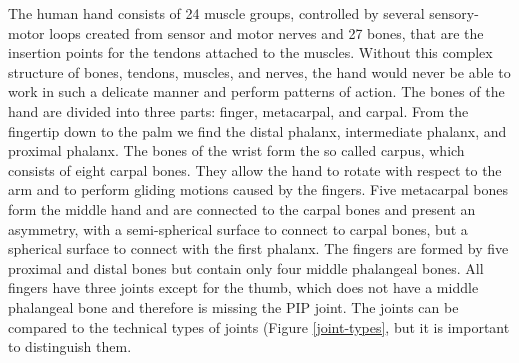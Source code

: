 \documentclass[main]{subfiles}
\begin{document}
The human hand consists of 24 muscle groups, controlled by several sensory-motor loops created from sensor and motor nerves and 27 bones, that are the insertion points for the tendons attached to the muscles. Without this complex structure of bones, tendons, muscles, and nerves, the hand would never be able to work in such a delicate manner and perform patterns of action. The bones of the hand are divided into three parts: finger, metacarpal, and carpal. From the fingertip down to the palm we find the distal phalanx, intermediate phalanx, and proximal phalanx. The bones of the wrist form the so called carpus, which consists of eight carpal bones. They allow the hand to rotate with respect to the arm and to perform gliding motions caused by the fingers. Five metacarpal bones form the middle hand and are connected to the carpal bones and present an asymmetry, with a semi-spherical surface to connect to carpal bones, but a spherical surface to connect with the first phalanx. The fingers are formed by five proximal and distal bones but contain only four middle phalangeal bones. All fingers have three joints except for the thumb, which does not have a middle phalangeal bone and therefore is missing the PIP joint. The joints can be compared to the technical types of joints (Figure \ref{joint-types}, but it is important to distinguish them.
\end{document}
